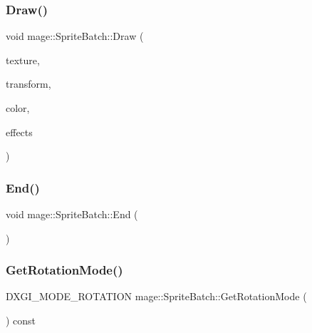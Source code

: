 \subsubsection{\texorpdfstring{Draw()}{Draw()}}
{\footnotesize\ttfamily void mage\+::\+Sprite\+Batch\+::\+Draw (\begin{DoxyParamCaption}\item[{I\+D3\+D11\+Shader\+Resource\+View $\ast$}]{texture,  }\item[{const \hyperlink{structmage_1_1_sprite_transform}{Sprite\+Transform} \&}]{transform,  }\item[{X\+M\+V\+E\+C\+T\+OR}]{color,  }\item[{\hyperlink{namespacemage_a06ff9ac76b1e0636cc8949c3f0d4ac46}{Sprite\+Effects}}]{effects }\end{DoxyParamCaption})}

\hypertarget{classmage_1_1_sprite_batch_a9764372bb18b1c24a4a2f64ab0649569}{}\label{classmage_1_1_sprite_batch_a9764372bb18b1c24a4a2f64ab0649569} 
\subsubsection{\texorpdfstring{End()}{End()}}
{\footnotesize\ttfamily void mage\+::\+Sprite\+Batch\+::\+End (\begin{DoxyParamCaption}{ }\end{DoxyParamCaption})}

\hypertarget{classmage_1_1_sprite_batch_ade698c44432d175ca55a4545b9adae85}{}\label{classmage_1_1_sprite_batch_ade698c44432d175ca55a4545b9adae85} 
\subsubsection{\texorpdfstring{Get\+Rotation\+Mode()}{GetRotationMode()}}
{\footnotesize\ttfamily D\+X\+G\+I\+\_\+\+M\+O\+D\+E\+\_\+\+R\+O\+T\+A\+T\+I\+ON mage\+::\+Sprite\+Batch\+::\+Get\+Rotation\+Mode (\begin{DoxyParamCaption}{ }\end{DoxyParamCaption}) const}

\hypertarget{classmage_1_1_sprite_batch_a67bdd7fb00644aefb3c7ecfaa7923a39}{}\label{classmage_1_1_sprite_batch_a67bdd7fb00644aefb3c7ecfaa7923a39} 
